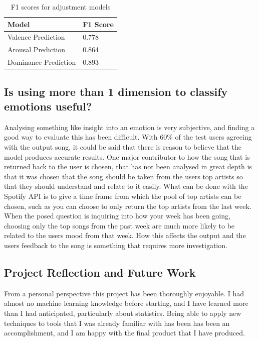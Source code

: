 \begin{table}[h]
\centering
\caption{F1 scores for adjustment models}
\begin{tabular}{|l|l|}
\hline
Model & F1 Score \\ \hline
 Valence Prediction &  0.778\\
 Arousal Prediction &  0.864\\
 Dominance Prediction &  0.893\\
 \hline
\end{tabular}
\label{f1:adj}
\end{table}

\subsection{Is using more than 1 dimension to classify emotions useful?}

Analysing something like insight into an emotion is very subjective, and finding a good way to evaluate this has been difficult. With 60\% of the test users agreeing with the output song, it could be said that there is reason to believe that the model produces accurate results. One major contributor to how the song that is returned back to the user is chosen, that has not been analysed in great depth is that it was chosen that the song should be taken from the users top artists so that they should understand and relate to it easily. What can be done with the Spotify API is to give a time frame from which the pool of top artists can be chosen, such as you can choose to only return the top artists from the last week. When the posed question is inquiring into how your week has been going, choosing only the top songs from the past week are much more likely to be related to the users mood from that week. How this affects the output and the users feedback to the song is something that requires more investigation. 

\subsection{Project Reflection and Future Work}

From a personal perspective this project has been thoroughly enjoyable. I had almost no machine learning knowledge before starting, and I have learned more than I had anticipated, particularly about statistics. Being able to apply new techniques to tools that I was already familiar with has been has been an accomplishment, and I am happy with the final product that I have produced. 

